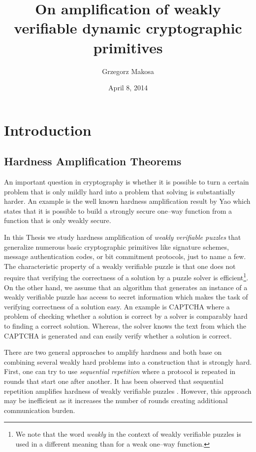 \documentclass[11pt,a4paper,titlepage]{memoir}
\title{On amplification of weakly verifiable dynamic cryptographic primitives}
\author{Grzegorz Makosa}
\date{April 8, 2014}
\begin{document}
\frontmatter

%

\cleartorecto
\tableofcontents
\mainmatter

\chapter{Introduction}
\section{Hardness Amplification Theorems}
An important question in cryptography is whether it is possible to turn a certain problem
that is only mildly hard into a problem that solving is substantially harder.
An example is the well known hardness amplification result by Yao \cite{Goldreich:2000:FCB:519078}
which states that it is possible to build a strongly secure one--way function from a function that is only weakly secure.

In this Thesis we study hardness amplification of \textit{weakly verifiable puzzles} that
generalize numerous basic cryptographic primitives like signature schemes,
message authentication codes, or bit commitment protocols, just to name a few.
The characteristic property of a weakly verifiable puzzle is that one does not require that verifying the correctness of a solution
by a puzzle solver is efficient\footnote{We note that the word \textit{weakly} in the context of weakly verifiable
puzzles is used in a different meaning than for a weak one--way function.}.
On the other hand, we assume that an algorithm that generates an instance of a weakly verifiable puzzle
has access to secret information which makes the task of verifying correctness of a solution easy.
An example is CAPTCHA where a problem of checking whether a solution is correct by a solver is comparably hard to finding a correct solution.
Whereas, the solver knows the text from which the CAPTCHA is generated and can easily verify whether a solution is correct.

There are two general approaches to amplify hardness and both base on combining several weakly hard problems into
a construction that is strongly hard. First, one can try to use \textit{sequential repetition} where a protocol is repeated
in rounds that start one after another. It has been observed that sequential repetition amplifies hardness
of weakly verifiable puzzles \cite{von2003captcha}. However, this approach may be inefficient as it increases
the number of rounds creating additional communication burden.
\end{document}
